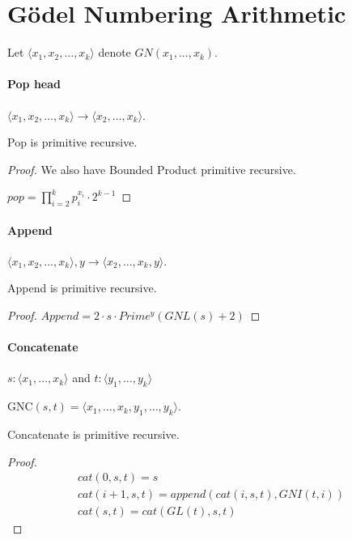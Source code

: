 \section{G\"{o}del Numbering Arithmetic}

Let $\langle x_1, x_2,\dots, x_k \rangle$ denote $GN(x_1, ..., x_k)$.

\paragraph{Pop head} $\langle x_1, x_2,\dots, x_k \rangle \rightarrow \langle  x_2,\dots, x_k \rangle$.

\begin{theorem}
Pop is primitive recursive.
\end{theorem}

\begin{proof}
We also have Bounded Product primitive recursive.

$pop = \prod_{i=2}^k p_i^{x_i} \cdot 2^{k-1}$
\end{proof}

\paragraph{Append} $\langle x_1, x_2,\dots, x_k \rangle, y \rightarrow \langle  x_2,\dots, x_k, y\rangle$.

\begin{theorem}
Append is primitive recursive.
\end{theorem}

\begin{proof}
$Append = 2 \cdot s \cdot Prime^y(GNL(s) +2)$
\end{proof}

\paragraph{Concatenate} $s: \langle x_1,\dots,x_k\rangle$ and $t: \langle y_1,\dots,y_k\rangle $

$\text{GNC}(s,t) =
 \langle x_1,\dots,x_k,y_1,\dots,y_k\rangle$.

\begin{theorem}
Concatenate is primitive recursive.
\end{theorem}

\begin{proof}
\begin{gather*}
    cat(0,s,t) = s\\
    cat(i+1,s,t)=append(cat(i,s,t), GNI(t,i))\\
    cat(s,t) = cat(GL(t),s,t)
\end{gather*}
\end{proof}

